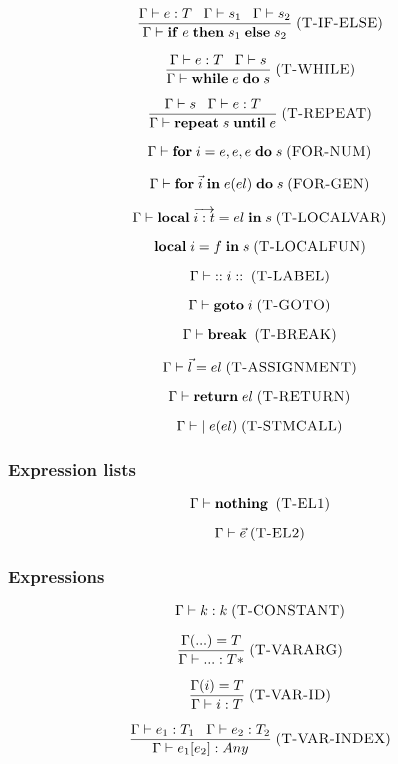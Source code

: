 \documentclass[12pt]{article}
\newcommand{\mylabel}[1]{\; (\textsc{#1})}
\newcommand{\pipe}{|\;}
\newcommand{\kw}[1]{\mathbf{#1} \;}
\newcommand{\env}{\Gamma}
\begin{document}
\[
\frac{\env \vdash e:T \;\;\;
      \env \vdash s_{1} \;\;\;
      \env \vdash s_{2}}
     {\env \vdash \kw{if} e \; \kw{then} s_{1} \; \kw{else} s_{2}}
\mylabel{T-IF-ELSE}
\]

\[
\frac{\env \vdash e:T \;\;\;
      \env \vdash s}
     {\env \vdash \kw{while} e \; \kw{do} s}
\mylabel{T-WHILE}
\]

\[
\frac{\env \vdash s \;\;\;
      \env \vdash e:T}
     {\env \vdash \kw{repeat} s \; \kw{until} e}
\mylabel{T-REPEAT}
\]

\[
\env \vdash \kw{for} i=e,e,e \; \kw{do} s
\mylabel{FOR-NUM}
\]

\[
\env \vdash \kw{for} \vec{i} \; \kw{in} e(el) \; \kw{do} s
\mylabel{FOR-GEN}
\]

\[
\env \vdash \kw{local} \overrightarrow{i:t} = el \; \kw{in} s
\mylabel{T-LOCALVAR}
\]

\[
\kw{local} i = f \; \kw{in} s
\mylabel{T-LOCALFUN}
\]

\[
\env \vdash \kw{::} i \; \kw{::}
\mylabel{T-LABEL}
\]

\[
\env \vdash \kw{goto} i
\mylabel{T-GOTO}
\]

\[
\env \vdash \kw{break}
\mylabel{T-BREAK}
\]

\[
\env \vdash \vec{l} = el
\mylabel{T-ASSIGNMENT}
\]

\[
\env \vdash \kw{return} el
\mylabel{T-RETURN}
\]

\[
\env \vdash \pipe e(el)
\mylabel{T-STMCALL}
\]

\subsubsection{Expression lists}

\[
\env \vdash \kw{nothing}
\mylabel{T-EL1}
\]

\[
\env \vdash \vec{e}
\mylabel{T-EL2}
\]

\subsubsection{Expressions}

\[
\env \vdash k : k
\mylabel{T-CONSTANT}
\]

\[
\frac{\env({...}) = T}
     {\env \vdash {...} : T*}
\mylabel{T-VARARG}
\]

\[
\frac{\env(i) = T}
     {\env \vdash i : T}
\mylabel{T-VAR-ID}
\]

\[
\frac{\env \vdash e_{1}:T_{1} \;\;\;
      \env \vdash e_{2}:T_{2}}
     {\env \vdash e_{1}[e_{2}] : Any}
\mylabel{T-VAR-INDEX}
\]
\end{document}
